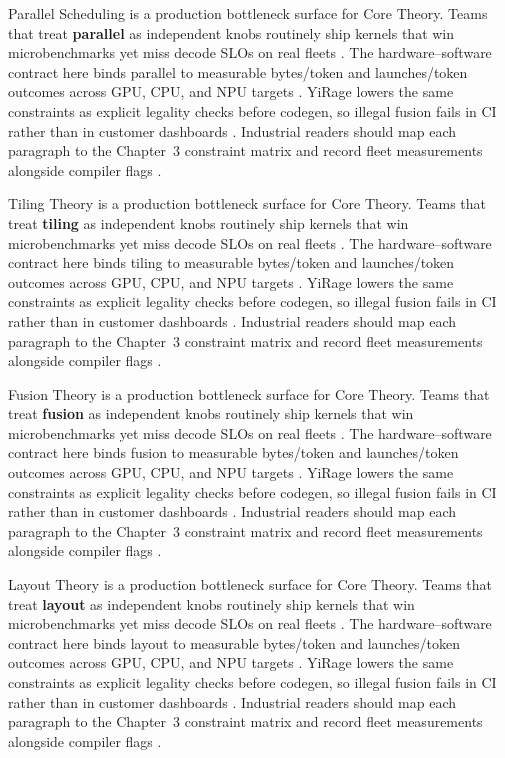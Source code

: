 Parallel Scheduling is a production bottleneck surface for Core Theory. Teams that treat \textbf{parallel} as independent knobs routinely ship kernels that win microbenchmarks yet miss decode SLOs on real fleets \citep{nvidia2022hopper,amd2024aie}. The hardware--software contract here binds parallel to measurable bytes/token and launches/token outcomes across GPU, CPU, and NPU targets \citep{semianalysis2024tma,dlbook}. YiRage lowers the same constraints as explicit legality checks before codegen, so illegal fusion fails in CI rather than in customer dashboards \citep{amd2024xdna,dao2022flashattention}. Industrial readers should map each paragraph to the Chapter~3 constraint matrix and record fleet measurements alongside compiler flags \citep{amd2024aie,kwon2023vllm}.

Tiling Theory is a production bottleneck surface for Core Theory. Teams that treat \textbf{tiling} as independent knobs routinely ship kernels that win microbenchmarks yet miss decode SLOs on real fleets \citep{taxbreak2026,semianalysis2024tma}. The hardware--software contract here binds tiling to measurable bytes/token and launches/token outcomes across GPU, CPU, and NPU targets \citep{memoryfloor2026,amd2024xdna}. YiRage lowers the same constraints as explicit legality checks before codegen, so illegal fusion fails in CI rather than in customer dashboards \citep{nvidia2022hopper,amd2024aie}. Industrial readers should map each paragraph to the Chapter~3 constraint matrix and record fleet measurements alongside compiler flags \citep{semianalysis2024tma,dlbook}.

Fusion Theory is a production bottleneck surface for Core Theory. Teams that treat \textbf{fusion} as independent knobs routinely ship kernels that win microbenchmarks yet miss decode SLOs on real fleets \citep{memoryfloor2026,amd2024xdna}. The hardware--software contract here binds fusion to measurable bytes/token and launches/token outcomes across GPU, CPU, and NPU targets \citep{nvidia2022hopper,amd2024aie}. YiRage lowers the same constraints as explicit legality checks before codegen, so illegal fusion fails in CI rather than in customer dashboards \citep{semianalysis2024tma,dlbook}. Industrial readers should map each paragraph to the Chapter~3 constraint matrix and record fleet measurements alongside compiler flags \citep{amd2024xdna,dao2022flashattention}.

Layout Theory is a production bottleneck surface for Core Theory. Teams that treat \textbf{layout} as independent knobs routinely ship kernels that win microbenchmarks yet miss decode SLOs on real fleets \citep{nvidia2022hopper,amd2024aie}. The hardware--software contract here binds layout to measurable bytes/token and launches/token outcomes across GPU, CPU, and NPU targets \citep{semianalysis2024tma,dlbook}. YiRage lowers the same constraints as explicit legality checks before codegen, so illegal fusion fails in CI rather than in customer dashboards \citep{amd2024xdna,dao2022flashattention}. Industrial readers should map each paragraph to the Chapter~3 constraint matrix and record fleet measurements alongside compiler flags \citep{amd2024aie,kwon2023vllm}.

